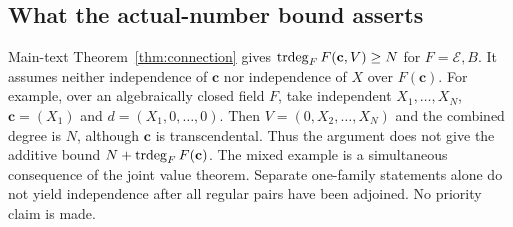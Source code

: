 \subsection*{What the actual-number bound asserts}
Main-text Theorem~\ref{thm:connection} gives
$\operatorname{trdeg}_F F(\mathbf c,V)\ge N$ for $F=\mathcal E,B$.
It assumes neither independence of $\mathbf c$ nor independence of $X$ over $F(\mathbf c)$.
For example, over an algebraically closed field $F$, take independent
$X_1,\ldots,X_N$, $\mathbf c=(X_1)$ and $d=(X_1,0,\ldots,0)$.
Then $V=(0,X_2,\ldots,X_N)$ and the combined degree is $N$,
although $\mathbf c$ is transcendental. Thus the argument does not give the
additive bound $N+\operatorname{trdeg}_F F(\mathbf c)$.
The mixed example is a simultaneous consequence of the joint value
theorem. Separate one-family statements alone do not yield independence
after all regular pairs have been adjoined. No priority claim is made.
